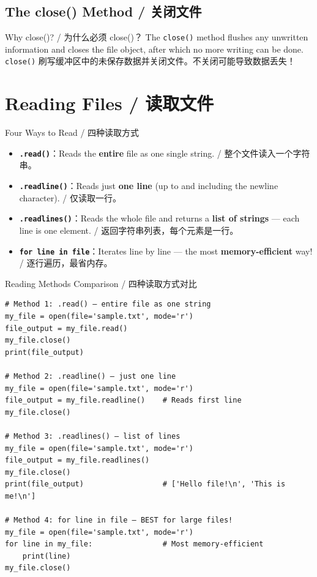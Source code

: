 \documentclass[11pt,a4paper]{article}
\begin{document}
\subsection{The close() Method / 关闭文件}

\begin{concept}{Why close()? / 为什么必须 close()？}
    The \texttt{close()} method flushes any unwritten information and closes the file object, after which no more writing can be done. \\
    \texttt{close()} 刷写缓冲区中的未保存数据并关闭文件。不关闭可能导致数据丢失！
\end{concept}

\section{Reading Files / 读取文件}

\begin{concept}{Four Ways to Read / 四种读取方式}
    \begin{itemize}[itemsep=0.8em]
        \item \textbf{\texttt{.read()}}：Reads the \textbf{entire} file as one single string. / 整个文件读入一个字符串。
        \item \textbf{\texttt{.readline()}}：Reads just \textbf{one line} (up to and including the newline character). / 仅读取一行。
        \item \textbf{\texttt{.readlines()}}：Reads the whole file and returns a \textbf{list of strings} — each line is one element. / 返回字符串列表，每个元素是一行。
        \item \textbf{\texttt{for line in file}}：Iterates line by line — the most \textbf{memory-efficient} way! / 逐行遍历，最省内存。
    \end{itemize}
\end{concept}

\begin{examplebox}{Reading Methods Comparison / 四种读取方式对比}
\begin{lstlisting}
# Method 1: .read() — entire file as one string
my_file = open(file='sample.txt', mode='r')
file_output = my_file.read()
my_file.close()
print(file_output)

# Method 2: .readline() — just one line
my_file = open(file='sample.txt', mode='r')
file_output = my_file.readline()    # Reads first line
my_file.close()

# Method 3: .readlines() — list of lines
my_file = open(file='sample.txt', mode='r')
file_output = my_file.readlines()
my_file.close()
print(file_output)                  # ['Hello file!\n', 'This is me!\n']

# Method 4: for line in file — BEST for large files!
my_file = open(file='sample.txt', mode='r')
for line in my_file:                # Most memory-efficient
    print(line)
my_file.close()
\end{lstlisting}
\end{examplebox}
\end{document}
